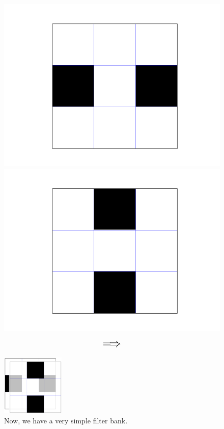         \begin{figure}[ht]
            \begin{minipage}{.35\textwidth}
              \centering
              \includegraphics[width=.6\linewidth]{images/convolutional_neural_networks_images/filterbank_1.png}
              \includegraphics[width=.6\linewidth]{images/convolutional_neural_networks_images/filterbank_2.png}
            \end{minipage}
            \begin{minipage}{.3\textwidth}
                \centering
                $$\mathlarger{\mathlarger{\mathlarger{\implies}}}$$
            \end{minipage}
            \begin{minipage}{.1\textwidth}
                \centering
                \includegraphics[width=30mm,scale=0.5]{images/convolutional_neural_networks_images/filterbank_k2.png}
            \end{minipage}
            \caption*{Now, we have a very simple filter bank.}
        \end{figure}


